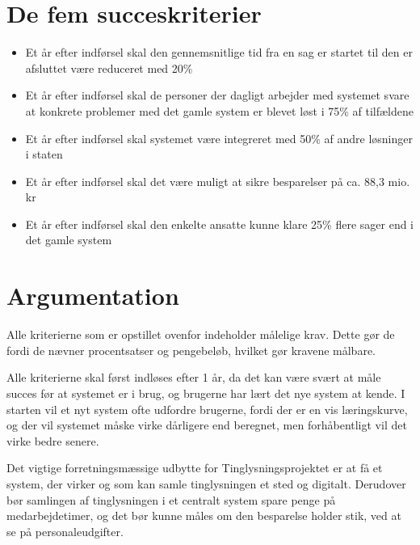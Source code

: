 \documentclass[10pt,a4paper,danish]{article}
\title{}
\author{Søren Pilgård, 190689, vpb984\\
Caroline Miller, 04071979, twq135\\
Rene}
\begin{document}
\maketitle
\newpage

\tableofcontents
\newpage

\section{De fem succeskriterier}

\begin{itemize}
\item Et år efter indførsel skal den gennemsnitlige tid fra en sag er startet til den er afsluttet være reduceret med 20\%
\item Et år efter indførsel skal de personer der dagligt arbejder med systemet svare at konkrete problemer med det gamle system er blevet løst i 75\% af tilfældene
\item Et år efter indførsel skal systemet være integreret med 50\% af andre løsninger i staten
\item Et år efter indførsel skal det være muligt at sikre besparelser på ca. 88,3 mio. kr
\item Et år efter indførsel skal den enkelte ansatte kunne klare 25\% flere sager end i det gamle system
\end{itemize}

\section{Argumentation}
Alle kriterierne som er opstillet ovenfor indeholder målelige krav. Dette gør de fordi de nævner procentsatser og pengebeløb, hvilket gør kravene målbare.

Alle kriterierne skal først indløses efter 1 år, da det kan være svært at måle succes før at systemet er i brug, og brugerne har lært det nye system at kende. I starten vil et nyt system ofte udfordre brugerne, fordi der er en vis læringskurve, og der vil systemet måske virke dårligere end beregnet, men forhåbentligt vil det virke bedre senere.

Det vigtige forretningsmæssige udbytte for Tinglysningsprojektet er at få et system, der virker og som kan samle tinglysningen et sted og digitalt. Derudover bør samlingen af tinglysningen i et centralt system spare penge på medarbejdetimer, og det bør kunne måles om den besparelse holder stik, ved at se på personaleudgifter.
\end{document}
